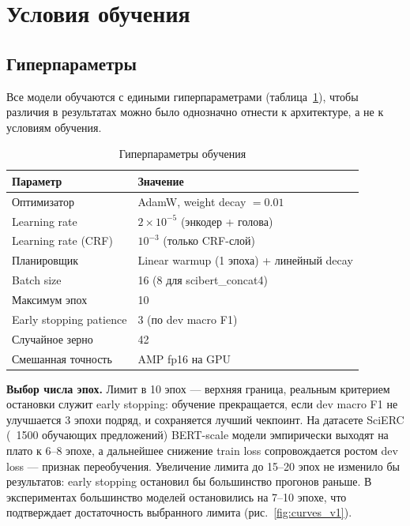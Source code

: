 \section{Условия обучения}
\label{sec:experiments}

\subsection{Гиперпараметры}

Все модели обучаются с едиными гиперпараметрами (таблица~\ref{tab:hparams}), чтобы различия в результатах можно было однозначно отнести к архитектуре, а не к условиям обучения.

\begin{table}[h]
\centering
\caption{Гиперпараметры обучения}
\label{tab:hparams}
\begin{tabular}{ll}
\toprule
\textbf{Параметр} & \textbf{Значение} \\
\midrule
Оптимизатор             & AdamW, weight decay $= 0.01$ \\
Learning rate           & $2 \times 10^{-5}$ (энкодер + голова) \\
Learning rate (CRF)     & $10^{-3}$ (только CRF-слой) \\
Планировщик             & Linear warmup (1 эпоха) + линейный decay \\
Batch size              & 16 (8 для scibert\_concat4) \\
Максимум эпох           & 10 \\
Early stopping patience & 3 (по dev macro F1) \\
Случайное зерно         & 42 \\
Смешанная точность      & AMP fp16 на GPU \\
\bottomrule
\end{tabular}
\end{table}

\textbf{Выбор числа эпох.} Лимит в 10 эпох --- верхняя граница, реальным критерием остановки служит early stopping: обучение прекращается, если dev macro F1 не улучшается 3 эпохи подряд, и сохраняется лучший чекпоинт. На датасете SciERC (~1500 обучающих предложений) BERT-scale модели эмпирически выходят на плато к 6--8 эпохе, а дальнейшее снижение train loss сопровождается ростом dev loss --- признак переобучения. Увеличение лимита до 15--20 эпох не изменило бы результатов: early stopping остановил бы большинство прогонов раньше. В экспериментах большинство моделей остановились на 7--10 эпохе, что подтверждает достаточность выбранного лимита (рис.~\ref{fig:curves_v1}).


